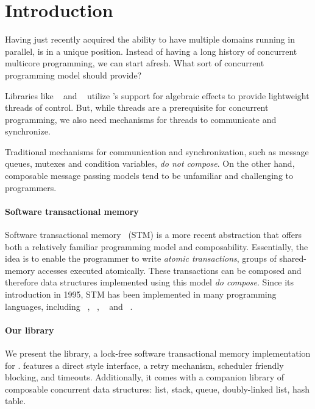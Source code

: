 \section{Introduction}
\label{sec:introduction}

Having just recently acquired the ability to have multiple domains running in parallel, \OCaml is in a unique position.
Instead of having a long history of concurrent multicore programming, we can start afresh.
What sort of concurrent programming model should \OCaml provide?

Libraries like \Eio~\citep{eio} and \Domainslib~\citep{domainslib} utilize \OCaml’s support for algebraic effects to provide lightweight threads of control.
But, while threads are a prerequisite for concurrent programming, we also need mechanisms for threads to communicate and synchronize.

Traditional mechanisms for communication and synchronization, such as message queues, mutexes and condition variables, \emph{do not compose}.
On the other hand, composable message passing models tend to be unfamiliar and challenging to programmers.

\paragraph{Software transactional memory}

Software transactional memory~\citep{DBLP:conf/podc/ShavitT95} (STM) is a more recent abstraction that offers both a relatively familiar programming model and composability.
Essentially, the idea is to enable the programmer to write \emph{atomic transactions}, \ie groups of shared-memory accesses executed atomically.
These transactions can be composed and therefore data structures implemented using this model \emph{do compose}.
Since its introduction in 1995, STM has been implemented in many programming languages, including \Cpp~\citep{wyatt-stm}, \CSharp~\citep{DBLP:conf/pldi/HarrisPST06}, \Haskell~\citep{DBLP:conf/ppopp/HarrisMPH05} and \Scala~\citep{scala-stm,zio}.

\paragraph{Our library}

We present the \Kcas library, a lock-free software transactional memory implementation for \OCaml.
\Kcas features a direct style interface, a retry mechanism, scheduler friendly blocking, and timeouts.
Additionally, it comes with a companion library \KcasData of composable concurrent data structures: list, stack, queue, doubly-linked list, hash table.

